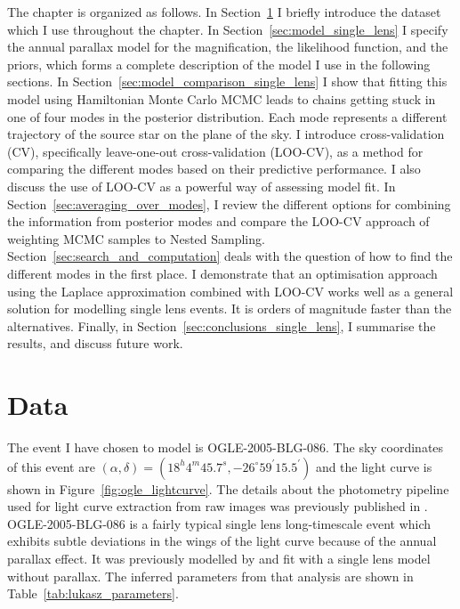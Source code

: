 \documentclass[12pt,dvipsnames]{report}
\begin{document}
The chapter is organized as follows.  In Section~\ref{sec:data_single_lens} I briefly 
introduce the dataset which I use throughout the chapter. In Section~\ref{sec:model_single_lens}
I specify the annual parallax model for the magnification, the likelihood function,
and the priors, which forms a complete description of the model I use in the following 
sections. In Section~\ref{sec:model_comparison_single_lens} I show that fitting this  
model using Hamiltonian Monte Carlo MCMC leads to chains getting stuck in one of four 
modes in the posterior distribution. Each mode represents a different trajectory 
of the source star on the plane of the sky.  I introduce cross-validation (CV), 
specifically leave-one-out cross-validation (LOO-CV), as a method for comparing the 
different modes based on their predictive performance. I also discuss the use of LOO-CV
as a powerful way of assessing model fit. In Section~\ref{sec:averaging_over_modes},
I review the different options for combining the information from posterior modes and 
compare the LOO-CV approach of weighting MCMC samples to Nested Sampling.
Section~\ref{sec:search_and_computation} deals with the question of how to find 
the different modes in the first place. I demonstrate that an optimisation approach 
using the Laplace approximation combined with LOO-CV works well as a general solution 
for modelling single lens events. It is orders of magnitude faster than the alternatives.
Finally, in Section~\ref{sec:conclusions_single_lens}, I summarise the results, 
and discuss future  work.

\section{Data}
\label{sec:data_single_lens}
The event I have chosen to model is OGLE-2005-BLG-086. The sky coordinates of this event
are $(\alpha, \delta)=(18^h 4^m 45.7^s, -26^\circ 59^\prime 15.5^\prime)$ and the 
light curve is shown in Figure~\ref{fig:ogle_lightcurve}. 
The details about the photometry pipeline used for light curve extraction from raw images 
was previously published in \citet{2008AcA....58...69U}.
OGLE-2005-BLG-086 is a fairly typical single lens long-timescale event which exhibits subtle 
deviations in the wings of the light curve because of the annual parallax effect.
It was previously modelled by \citet{2015ApJS..216...12W} and fit with a single lens model 
without parallax. The inferred parameters from that analysis are shown in 
Table~\ref{tab:lukasz_parameters}.
\end{document}
